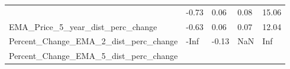 \documentclass[]{article}
\begin{document}
\begin{longtable}[]{@{}lllll@{}}
\begin{minipage}[t]{0.49\columnwidth}
\end{minipage} & \begin{minipage}[t]{0.08\columnwidth}\raggedright\strut
-0.73\strut
\end{minipage} & \begin{minipage}[t]{0.09\columnwidth}\raggedright\strut
0.06\strut
\end{minipage} & \begin{minipage}[t]{0.09\columnwidth}\raggedright\strut
0.08\strut
\end{minipage} & \begin{minipage}[t]{0.11\columnwidth}\raggedright\strut
15.06\strut
\end{minipage}\tabularnewline
\begin{minipage}[t]{0.49\columnwidth}\raggedright\strut
EMA\_Price\_5\_year\_dist\_perc\_change\strut
\end{minipage} & \begin{minipage}[t]{0.08\columnwidth}\raggedright\strut
-0.63\strut
\end{minipage} & \begin{minipage}[t]{0.09\columnwidth}\raggedright\strut
0.06\strut
\end{minipage} & \begin{minipage}[t]{0.09\columnwidth}\raggedright\strut
0.07\strut
\end{minipage} & \begin{minipage}[t]{0.11\columnwidth}\raggedright\strut
12.04\strut
\end{minipage}\tabularnewline
\begin{minipage}[t]{0.49\columnwidth}\raggedright\strut
Percent\_Change\_EMA\_2\_dist\_perc\_change\strut
\end{minipage} & \begin{minipage}[t]{0.08\columnwidth}\raggedright\strut
-Inf\strut
\end{minipage} & \begin{minipage}[t]{0.09\columnwidth}\raggedright\strut
-0.13\strut
\end{minipage} & \begin{minipage}[t]{0.09\columnwidth}\raggedright\strut
NaN\strut
\end{minipage} & \begin{minipage}[t]{0.11\columnwidth}\raggedright\strut
Inf\strut
\end{minipage}\tabularnewline
\begin{minipage}[t]{0.49\columnwidth}\raggedright\strut
Percent\_Change\_EMA\_5\_dist\_perc\_change\strut

\end{minipage}
\end{longtable}
\end{document}
